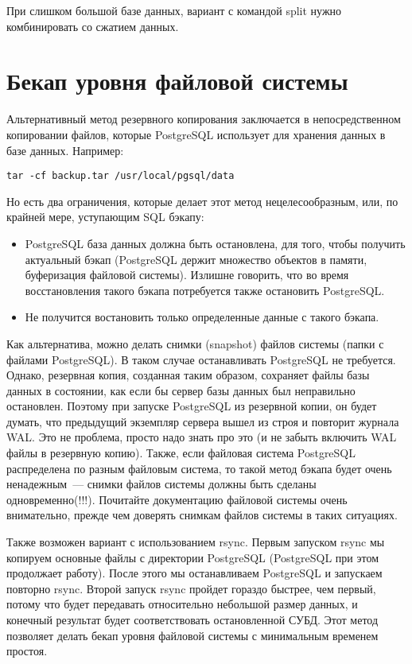 При слишком большой базе данных, вариант с командой split нужно комбинировать со сжатием данных.


\section{Бекап уровня файловой системы}
Альтернативный метод резервного копирования заключается в непосредственном копировании файлов, 
которые PostgreSQL использует для хранения данных в базе данных. Например:
\begin{lstlisting}[label=lst:backups14,caption=Бэкап PostgreSQL файлов]
tar -cf backup.tar /usr/local/pgsql/data
\end{lstlisting}

Но есть два ограничения, которые делает этот метод нецелесообразным, или, по крайней мере, уступающим SQL бэкапу:
\begin{itemize}
\item PostgreSQL база данных должна быть остановлена, для того, чтобы получить актуальный бэкап 
(PostgreSQL держит множество объектов в памяти, буферизация файловой системы). Излишне говорить, 
что во время восстановления такого бэкапа потребуется также остановить PostgreSQL.
\item Не получится востановить только определенные данные с такого бэкапа.
\end{itemize}

Как альтернатива, можно делать снимки (snapshot) файлов системы (папки с файлами PostgreSQL). В таком случае останавливать PostgreSQL 
не требуется. Однако, резервная копия, созданная таким образом, сохраняет файлы базы данных в состоянии, как если бы сервер базы данных 
был неправильно остановлен. Поэтому при запуске PostgreSQL из резервной копии, он будет думать, что предыдущий экземпляр 
сервера вышел из строя и повторит журнала WAL. Это не проблема, просто надо знать про это (и не забыть включить WAL файлы 
в резервную копию). Также, если файловая система PostgreSQL распределена по разным файловым система, то такой метод бэкапа 
будет очень ненадежным~--- снимки файлов системы должны быть сделаны одновременно(!!!). Почитайте документацию файловой 
системы очень внимательно, прежде чем доверять снимкам файлов системы в таких ситуациях.

Также возможен вариант с использованием rsync. Первым запуском rsync мы копируем основные файлы с директории PostgreSQL 
(PostgreSQL при этом продолжает работу). После этого 
мы останавливаем PostgreSQL и запускаем повторно rsync. Второй запуск rsync пройдет гораздо быстрее, чем первый, 
потому что будет передавать относительно небольшой размер данных, 
и конечный результат будет соответствовать остановленной СУБД. 
Этот метод позволяет делать бекап уровня файловой системы с минимальным временем простоя.

